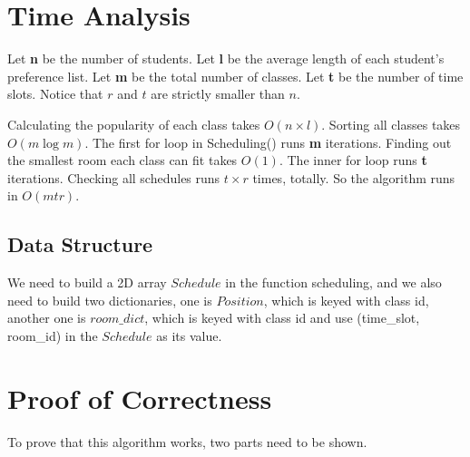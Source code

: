 \documentclass[11pt, oneside]{article}   	%
\begin{document}
\begin{algorithm}[H]
\end{algorithm}

\section{Time Analysis}
Let \textbf{n} be the number of students. 
Let \textbf{l} be the average length of each student's preference list.
Let \textbf{m} be the total number of classes. 
Let \textbf{t} be the number of time slots. 
Notice that $r$ and $t$ are strictly smaller than $n$.

Calculating the popularity of each class takes $O(n \times l)$. Sorting all classes takes $O(m\log m)$. The first for loop in Scheduling() runs \textbf{m} iterations. Finding out the smallest room each class can fit takes $O(1)$. The inner for loop runs \textbf{t} iterations. Checking all schedules runs $t \times r$ times, totally. So the algorithm runs in $O(mtr)$.

\subsection{Data Structure}
We need to build a 2D array $Schedule$ in the function scheduling, and we also need to build two dictionaries, one is $Position$, which is keyed with class id, another one is $room\_dict$, which is keyed with class id and use (time\_slot, room\_id) in the $Schedule$ as its value. 


\section{Proof of Correctness}
To prove that this algorithm works, two parts need to be shown.
\end{document}

